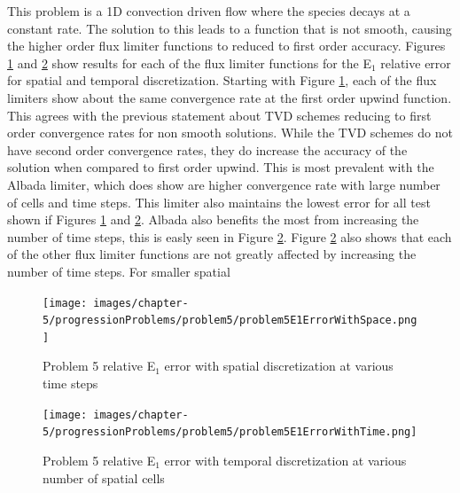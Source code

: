 This problem is a 1D convection driven flow where the species decays at a constant rate. The solution to this leads to a function that is not smooth, causing the higher order flux limiter functions to reduced to first order accuracy. Figures \ref{fig:problem5_l1error_spatial_results} and \ref{fig:problem5_l1error_time_results} show results for each of the flux limiter functions for the E${}_{1}$ relative error for spatial and temporal discretization. Starting with Figure \ref{fig:problem5_l1error_spatial_results}, each of the flux limiters show about the same convergence rate at the first order upwind function. This agrees with the previous statement about TVD schemes reducing to first order convergence rates for non smooth solutions. While the TVD schemes do not have second order convergence rates, they do increase the accuracy of the solution when compared to first order upwind. This is most prevalent with the Albada limiter, which does show are higher convergence rate with large number of cells and time steps. This limiter also maintains the lowest error for all test shown if Figures \ref{fig:problem5_l1error_spatial_results} and \ref{fig:problem5_l1error_time_results}. Albada also benefits the most from increasing the number of time steps, this is easly seen in Figure \ref{fig:problem5_l1error_time_results}. Figure \ref{fig:problem5_l1error_time_results} also shows that each of the other flux limiter functions are not greatly affected by increasing the number of time steps. For smaller spatial 

\clearpage

\begin{figure}[p]
    \centering
    \texttt{[image: images/chapter-5/progressionProblems/problem5/problem5E1ErrorWithSpace.png]}
    \caption{Problem 5 relative E${}_{1}$ error with spatial discretization at various time steps}
    \label{fig:problem5_l1error_spatial_results}
\end{figure}

\clearpage

\begin{figure}[p]
    \centering
    \texttt{[image: images/chapter-5/progressionProblems/problem5/problem5E1ErrorWithTime.png]}
    \caption{Problem 5 relative E${}_{1}$ error with temporal discretization at various number of spatial cells}
    \label{fig:problem5_l1error_time_results}
\end{figure}

\clearpage

